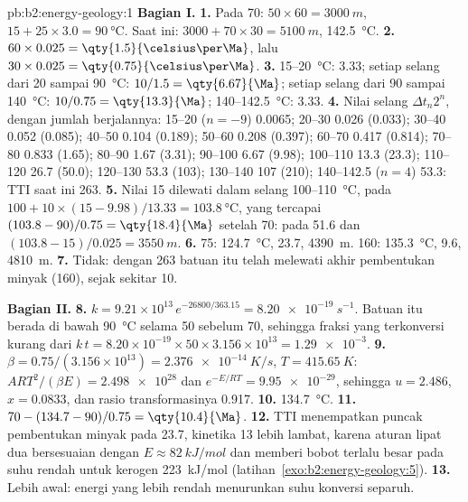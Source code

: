 \begin{solution}{pb:b2:energy-geology:1}
\noindent\textbf{Bagian I.}
\textbf{1.} Pada \qty{70}{\Ma}: $50 \times 60 = \qty{3000}{m}$, $15 + 25 \times 3.0 =
\qty{90}{\celsius}$. Saat ini: $3000 + 70 \times 30 = \qty{5100}{m}$, \qty{142.5}{\celsius}.
\textbf{2.} $60 \times 0.025 = \qty{1.5}{\celsius\per\Ma}$, lalu $30 \times 0.025 =
\qty{0.75}{\celsius\per\Ma}$.
\textbf{3.} 15--\qty{20}{\celsius}: \qty{3.33}{\Ma}; setiap selang dari 20 sampai \qty{90}{\celsius}:
$10/1.5 = \qty{6.67}{\Ma}$; setiap selang dari 90 sampai \qty{140}{\celsius}: $10/0.75 = \qty{13.3}{\Ma}$;
140--\qty{142.5}{\celsius}: \qty{3.33}{\Ma}.
\textbf{4.} Nilai selang $\Delta t_n 2^n$, dengan jumlah berjalannya: 15--20 ($n = -9$) 0.0065; 20--30
0.026 (0.033); 30--40 0.052 (0.085); 40--50 0.104 (0.189); 50--60 0.208 (0.397); 60--70 0.417
(0.814); 70--80 0.833 (1.65); 80--90 1.67 (3.31); 90--100 6.67 (9.98); 100--110 13.3 (23.3);
110--120 26.7 (50.0); 120--130 53.3 (103); 130--140 107 (210); 140--142.5 ($n = 4$) 53.3: TTI
saat ini 263.
\textbf{5.} Nilai 15 dilewati dalam selang 100--\qty{110}{\celsius}, pada $100 + 10 \times
(15 - 9.98)/13.33 = \qty{103.8}{\celsius}$, yang tercapai $(103.8 - 90)/0.75 = \qty{18.4}{\Ma}$ setelah
\qty{70}{\Ma}: pada \qty{51.6}{\Ma} dan $(103.8 - 15)/0.025 = \qty{3550}{m}$.
\textbf{6.} 75: \qty{124.7}{\celsius}, \qty{23.7}{\Ma}, \qty{4390}{m}. 160: \qty{135.3}{\celsius},
\qty{9.6}{\Ma}, \qty{4810}{m}.
\textbf{7.} Tidak: dengan 263 batuan itu telah melewati akhir pembentukan minyak (160), sejak sekitar \qty{10}{\Ma}.

\noindent\textbf{Bagian II.}
\textbf{8.} $k = 9.21 \times 10^{13}\,e^{-26800/363.15} = \qty{8.20e-19}{s^{-1}}$. Batuan itu
berada di bawah \qty{90}{\celsius} selama \qty{50}{\Ma} sebelum \qty{70}{\Ma}, sehingga fraksi yang terkonversi
kurang dari $k\,t = 8.20 \times 10^{-19} \times 50 \times 3.156 \times 10^{13} = \num{1.29e-3}$.
\textbf{9.} $\beta = 0.75/(3.156 \times 10^{13}) = \qty{2.376e-14}{K/s}$, $T = \qty{415.65}{K}$:
$ART^2/(\beta E) = \num{2.498e28}$ dan $e^{-E/RT} = \num{9.95e-29}$, sehingga $u = 2.486$, $x = 0.0833$, dan
rasio transformasinya 0.917.
\textbf{10.} \qty{134.7}{\celsius}.
\textbf{11.} $70 - (134.7 - 90)/0.75 = \qty{10.4}{\Ma}$.
\textbf{12.} TTI menempatkan puncak pembentukan minyak pada \qty{23.7}{\Ma}, kinetika \qty{13}{\Ma} lebih lambat,
karena aturan lipat dua bersesuaian dengan $E \approx \qty{82}{kJ/mol}$ dan memberi bobot terlalu besar pada suhu
rendah untuk kerogen \qty{223}{kJ/mol} (latihan~\ref{exo:b2:energy-geology:5}).
\textbf{13.} Lebih awal: energi yang lebih rendah menurunkan suhu konversi separuh.


\end{solution}
